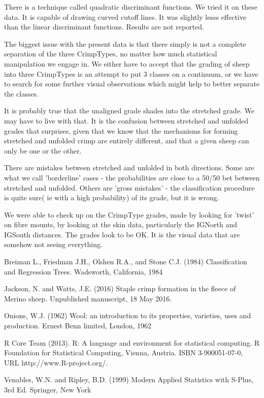 \documentclass[titlepage]{article}  %
\begin{document}
There is a technique called quadratic discriminant functions. We tried it on these data. It  is capable of drawing curved cutoff lines. It was slightly lesss effective than the linear discriminant functions. Results are not reported.

The biggest issue with the present data is that there simply is not a complete separation of the three CrimpTypes, no matter how much statistical manipulation we engage in. We either have to accept that the grading of sheep into three CrimpTypes is an attempt to put 3 classes on a continuum, or we have to search for some further visual observations which might help to better separate the classes. 

It is probably true that the unaligned grade shades into the stretched grade. We may have to live with that. It is the confusion between stretched and unfolded grades that surprises, given that we know that the mechanisms for forming stretched and unfolded crimp are entirely different, and that a given sheep can only be one or the other.

There are mistakes between stretched and unfolded in both directions. Some are what we call 'borderline' cases - the probabilities are close to a 50/50 bet between stretched and unfolded. Others are 'gross mistakes' - the classification procedure is quite sure( ie with a high probability) of its grade, but it is wrong.

We were able to check up on  the CrimpType grades, made by looking for 'twist' on fibre mounts, by looking at the skin data, particularly the IGNorth and IGSouth distances. The grades look to be OK. It is the visual data that are somehow not seeing everything.
 

\begin{thebibliography}{99}

Breiman L., Friedman J.H., Olshen R.A., and Stone C.J. (1984)
Classification and Regression Trees. Wadsworth, California, 1984


Jackson, N. and Watts, J.E. (2016) Staple crimp formation in the fleece of Merino sheep. Unpublished manuscript, 18 May 2016.

Onions, W.J. (1962) Wool: an introduction to its properties, varieties, uses
     and production. Ernest Benn limited, London, 1962

R Core Team (2013). R: A language and environment for statistical
  computing. R Foundation for Statistical Computing, Vienna, Austria.
  ISBN 3-900051-07-0, URL http://www.R-project.org/.

Venables, W.N. and Ripley, B.D. (1999)
Modern Applied Statistics with S-Plus, 3rd Ed. Springer, New York

\end{thebibliography}
\end{document}
